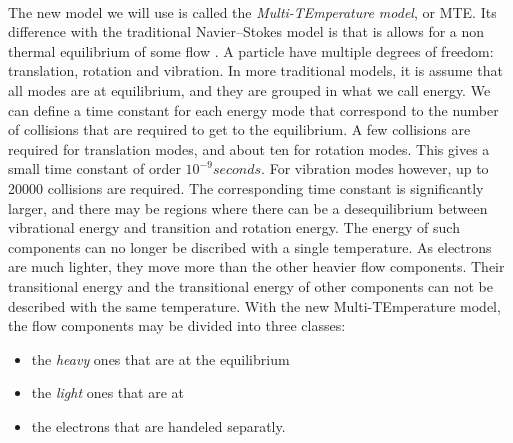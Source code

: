       \paragraph{}
      The new model we will use is called the \emph{Multi-TEmperature model}, or MTE.
      Its difference with the traditional Navier--Stokes model is that is allows for a non thermal equilibrium of some flow .
      A particle have multiple degrees of freedom: translation, rotation and vibration.
      In more traditional models, it is assume that all modes are at equilibrium, and they are grouped in what we call energy.
      We can define a time constant for each energy mode that correspond to the number of collisions that are required to get to the equilibrium.
      A few collisions are required for translation modes, and about ten for rotation modes.
      This gives a small time constant of order $10^{-9}\si{seconds}$.
      For vibration modes however, up to \num{20000} collisions are required.
      The corresponding time constant is significantly larger, and there may be regions where there can be a desequilibrium between vibrational energy and transition and rotation energy.
      The energy of such components can no longer be discribed with a single temperature.
      As electrons are much lighter, they move more than the other heavier flow components.
      Their transitional energy and the transitional energy of other components can not be described with the same temperature.
      With the new Multi-TEmperature model, the flow components may be divided into three classes:
      \begin{itemize}
        \item the \emph{heavy} ones that are at the equilibrium
        \item the \emph{light} ones that are at 
        \item the electrons that are handeled separatly.
      \end{itemize}

